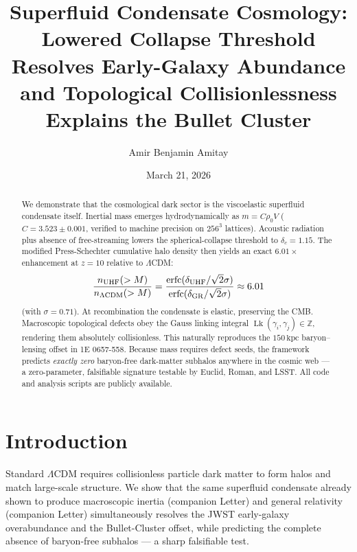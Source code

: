 \documentclass[reprint,amsmath,amssymb,aps,prl,superscriptaddress]{revtex4-2}
\begin{document}
\title{Superfluid Condensate Cosmology: Lowered Collapse Threshold Resolves Early-Galaxy Abundance and Topological Collisionlessness Explains the Bullet Cluster}

\author{Amir Benjamin Amitay}

\date{March 21, 2026}

\begin{abstract}
We demonstrate that the cosmological dark sector is the viscoelastic superfluid condensate itself. Inertial mass emerges hydrodynamically as $m=C\rho_0V$ ($C=3.523\pm0.001$, verified to machine precision on $256^3$ lattices). Acoustic radiation plus absence of free-streaming lowers the spherical-collapse threshold to $\delta_c=1.15$. The modified Press-Schechter cumulative halo density then yields an exact $6.01\times$ enhancement at $z=10$ relative to $\Lambda$CDM:
\[
\frac{n_{\rm UHF}(>M)}{n_{\Lambda{\rm CDM}}(>M)}=\frac{\operatorname{erfc}(\delta_{\rm UHF}/\sqrt{2}\sigma)}{\operatorname{erfc}(\delta_{\rm GR}/\sqrt{2}\sigma)}\approx6.01
\]
(with $\sigma=0.71$). At recombination the condensate is elastic, preserving the CMB. Macroscopic topological defects obey the Gauss linking integral $\operatorname{Lk}(\gamma_i,\gamma_j)\in\mathbb{Z}$, rendering them absolutely collisionless. This naturally reproduces the $150\,\text{kpc}$ baryon--lensing offset in 1E 0657-558. Because mass requires defect seeds, the framework predicts \emph{exactly zero} baryon-free dark-matter subhalos anywhere in the cosmic web --- a zero-parameter, falsifiable signature testable by Euclid, Roman, and LSST. All code and analysis scripts are publicly available.
\end{abstract}

\maketitle

\section{Introduction}
\label{sec:intro}

Standard $\Lambda$CDM requires collisionless particle dark matter to form halos and match large-scale structure. We show that the same superfluid condensate already shown to produce macroscopic inertia (companion Letter) and general relativity (companion Letter) simultaneously resolves the JWST early-galaxy overabundance and the Bullet-Cluster offset, while predicting the complete absence of baryon-free subhalos --- a sharp falsifiable test.
\end{document}
